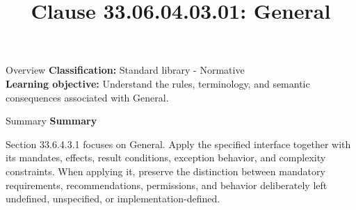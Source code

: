 \documentclass[10pt,letterpaper]{article}
\title{Clause 33.06.04.03.01: General}
\author{}
\date{}
\begin{document}
\maketitle
\begin{CornellOverviewBox}{Overview}
\textbf{Classification:} Standard library - Normative\\[2pt]
\textbf{Learning objective:} Understand the rules, terminology, and semantic consequences associated with General.
\end{CornellOverviewBox}\begin{CornellSummaryBox}{Summary}
{\sffamily\bfseries\color{Accent} Summary}\par\vspace{3pt}Section 33.6.4.3.1 focuses on General. Apply the specified interface together with its mandates, effects, result conditions, exception behavior, and complexity constraints. When applying it, preserve the distinction between mandatory requirements, recommendations, permissions, and behavior deliberately left undefined, unspecified, or implementation-defined.
\end{CornellSummaryBox}
\end{document}
